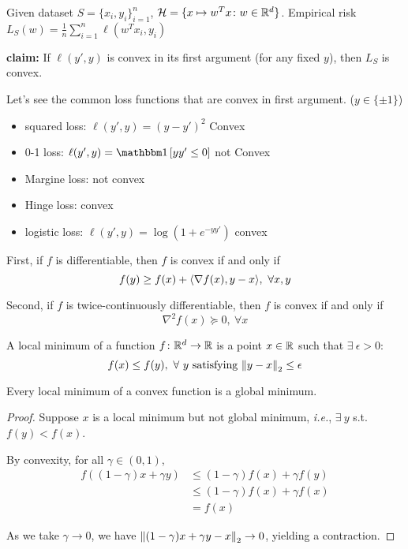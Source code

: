 \begin{eg} Given dataset \(S = \{x_i, y_i\}_{i=1}^n\), \(\mathcal{H} = \{x \mapsto w^T x \colon 
    w \in \mathbb{R}^d\}\). Empirical risk \(L_S(w) = \frac{1}{n} \sum_{i=1}^n \ell (w^Tx_i, y_i)\)

    \textbf{claim:} If \(\ell (y', y)\) is convex in its first argument (for any fixed \(y\)), 
    then \(L_S\) is convex. 
\end{eg}

Let's see the common loss functions that are convex in first argument. (\(y \in \{\pm 1\}\))

\begin{itemize}
    \item squared loss: \(\ell (y', y) = (y - y')^2\) Convex 
    \item 0-1 loss: \(\ell(y', y) = \indi \midBrac{yy' \leq 0}\) not Convex 
    \item Margine loss: not convex 
    \item Hinge loss: convex 
    \item logistic loss: \(\ell (y', y) = \log (1 + e^{-yy'})\) convex 
\end{itemize}

\begin{lemma}
    First, if \(f\) is differentiable, then \(f\) is convex if and only if 
    \[
        f(y) \geq f(x) + \langle \nabla f(x), y - x \rangle, \ \forall x, y  
    \]

    Second, if \(f\) is twice-continuously differentiable, then \(f\) is convex if and only if 
    \[
        \nabla^2 f(x) \succeq 0, \ \forall x   
    \]
\end{lemma}

\begin{definition} 
    A local minimum of a function \(f \colon \mathbb{R}^d \to \mathbb{R}\) is a point \(x \in \mathbb{R}\) such that 
    \(\exists  \ \epsilon > 0\): 
    \[
        f(x) \leq f(y), \ \forall \ y \text{ satisfying } \norm{y-x}_2 \leq \epsilon
    \]
\end{definition}


\begin{lemma}
    Every local minimum of a convex function is a global minimum. 
\end{lemma}
\begin{proof}
    Suppose \(x\) is a local minimum but not global minimum, \emph{i.e.},  
    \(\exists \ y\) s.t. \(f(y) < f(x)\). 

    By convexity, for all \(\gamma \in (0, 1)\), 
    \begin{align*}
        f( (1- \gamma)x + \gamma y) 
        &\leq (1 - \gamma) f(x) + \gamma f(y) \\ 
        &\leq (1 - \gamma) f(x) + \gamma f(x) \\ 
        &= f(x)
    \end{align*}

    As we take \(\gamma \to 0\), we have \(\norm{(1- \gamma) x + \gamma y - x}_2 \to 0\), 
    yielding a contraction. 
\end{proof}

